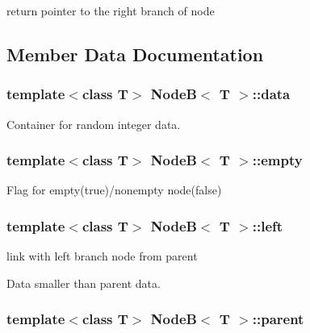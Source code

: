 return pointer to the right branch of node 



\subsection{Member Data Documentation}
\hypertarget{class_node_b_a9ce10550e81de48553bf37679a491ef5}{}
\subsubsection[{data}]{\setlength{\rightskip}{0pt plus 5cm}template$<$class T$>$ {\bf Node\+B}$<$ T $>$\+::data\hspace{0.3cm}{\ttfamily [private]}}\label{class_node_b_a9ce10550e81de48553bf37679a491ef5}


Container for random integer data. 

\hypertarget{class_node_b_a62077bf9d12b532c6177544bce9947d0}{}
\subsubsection[{empty}]{\setlength{\rightskip}{0pt plus 5cm}template$<$class T$>$ {\bf Node\+B}$<$ T $>$\+::empty\hspace{0.3cm}{\ttfamily [private]}}\label{class_node_b_a62077bf9d12b532c6177544bce9947d0}
Flag for empty(true)/nonempty node(false) \hypertarget{class_node_b_a8d8ba7388e899b41d6a50ba3e910d065}{}
\subsubsection[{left}]{\setlength{\rightskip}{0pt plus 5cm}template$<$class T$>$ {\bf Node\+B}$<$ T $>$\+::left\hspace{0.3cm}{\ttfamily [private]}}\label{class_node_b_a8d8ba7388e899b41d6a50ba3e910d065}


link with left branch node from parent 

Data smaller than parent data. \hypertarget{class_node_b_afba2126c75ecfa0d8e3320c07e3257dc}{}
\subsubsection[{parent}]{\setlength{\rightskip}{0pt plus 5cm}template$<$class T$>$ {\bf Node\+B}$<$ T $>$\+::parent\hspace{0.3cm}{\ttfamily [private]}}\label{class_node_b_afba2126c75ecfa0d8e3320c07e3257dc}


